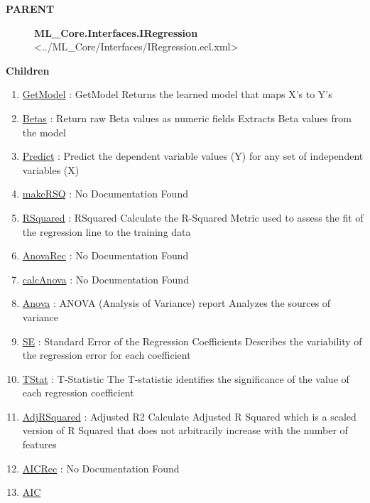 \par
\begin{description}
\item [\colorbox{tagtype}{\color{white} \textbf{\textsf{PARENT}}}] \textbf{ML\_Core.Interfaces.IRegression} <../ML\_Core/Interfaces/IRegression.ecl.xml>
\end{description}


\textbf{Children}
\begin{enumerate}
\item \hyperlink{ecldoc:linearregression.ols.getmodel}{GetModel}
: GetModel Returns the learned model that maps X's to Y's
\item \hyperlink{ecldoc:linearregression.ols.betas}{Betas}
: Return raw Beta values as numeric fields Extracts Beta values from the model
\item \hyperlink{ecldoc:linearregression.ols.predict}{Predict}
: Predict the dependent variable values (Y) for any set of independent variables (X)
\item \hyperlink{ecldoc:linearregression.ols.makersq}{makeRSQ}
: No Documentation Found
\item \hyperlink{ecldoc:linearregression.ols.rsquared}{RSquared}
: RSquared Calculate the R-Squared Metric used to assess the fit of the regression line to the training data
\item \hyperlink{ecldoc:linearregression.ols.anovarec}{AnovaRec}
: No Documentation Found
\item \hyperlink{ecldoc:linearregression.ols.calcanova}{calcAnova}
: No Documentation Found
\item \hyperlink{ecldoc:linearregression.ols.anova}{Anova}
: ANOVA (Analysis of Variance) report Analyzes the sources of variance
\item \hyperlink{ecldoc:linearregression.ols.se}{SE}
: Standard Error of the Regression Coefficients Describes the variability of the regression error for each coefficient
\item \hyperlink{ecldoc:linearregression.ols.tstat}{TStat}
: T-Statistic The T-statistic identifies the significance of the value of each regression coefficient
\item \hyperlink{ecldoc:linearregression.ols.adjrsquared}{AdjRSquared}
: Adjusted R2 Calculate Adjusted R Squared which is a scaled version of R Squared that does not arbitrarily increase with the number of features
\item \hyperlink{ecldoc:linearregression.ols.aicrec}{AICRec}
: No Documentation Found
\item \hyperlink{ecldoc:linearregression.ols.aic}{AIC}

\end{enumerate}
